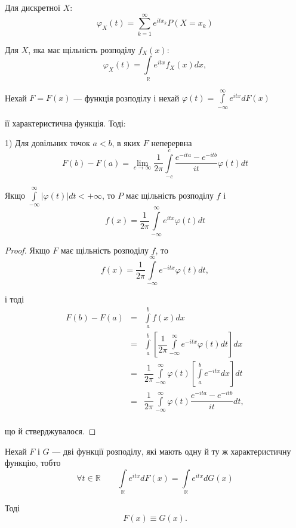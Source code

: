 Для дискретної $X$:
$$\varphi_{X}(t)
= \sum\limits_{k=1}^{\infty} e^{itx_k} P(X = x_k)$$

Для $X$, яка має щільність розподілу $f_X(x)$:
\begin{equation}
    \varphi_{X}(t)
    = \int\limits_{\mathbb{R}} e^{itx} f_X(x) dx,
\end{equation}

\begin{theorem}[Обернення]
    Нехай $F = F(x)$ --- функція розподілу і нехай 
    $\varphi(t) = \int\limits_{-\infty}^{\infty} e^{itx} dF(x)$

    її характеристична функція.
    Тоді:

    1) Для довільних точок $a < b$, в яких $F$ неперервна
    \begin{equation}
        F(b) - F(a) = \lim\limits_{c \rightarrow \infty} \dfrac{1}{2 \pi}
            \int\limits_{-c}^{c} \dfrac{e^{-ita}-e^{-itb}}{it} \varphi(t) dt
    \end{equation}

    Якщо $\int\limits_{-\infty}^{\infty} |\varphi(t)| dt < +\infty$, то $P$
    має щільність розподілу $f$ і
    \begin{equation}
        f(x) = \dfrac{1}{2 \pi} \int\limits_{-\infty}^{\infty} e^{itx} \varphi(t) dt
    \end{equation}
\end{theorem}
\begin{proof}
    Якщо $F$ має щільність розподілу $f$, то
    $$f(x) = \dfrac{1}{2 \pi} \int\limits_{-\infty}^{\infty} e^{-itx} \varphi(t) dt,$$

    і тоді
    $$\begin{array}{rcl}
        F(b) - F(a) & = & \int\limits_{a}^{b} f(x) dx \\
        & = & \int\limits_{a}^{b} \left[\dfrac{1}{2 \pi} \int\limits_{-\infty}^{\infty} e^{-itx} \varphi(t) dt\right] dx \\
        & = & \dfrac{1}{2 \pi} \int\limits_{-\infty}^{\infty} \varphi(t) \left[ \int\limits_{a}^{b} e^{-itx} dx\right] dt \\
        & = & \dfrac{1}{2 \pi} \int\limits_{-\infty}^{\infty} \varphi(t) \dfrac{e^{-ita} - e^{-itb}}{it} dt, \\
    \end{array}$$
    
    що й стверджувалося.
\end{proof}

\begin{theorem}[Єдиності]
    Нехай $F$ і $G$ --- дві функції розподілу, які мають
    одну й ту ж характеристичну
    функцію, тобто
    $$\forall t \in \mathbb{R} \qquad 
    \int\limits_{\mathbb{R}} e^{itx} dF(x)
    = \int\limits_{\mathbb{R}} e^{itx} dG(x)$$

    Тоді
    $$F(x) \equiv G(x).$$
\end{theorem}



